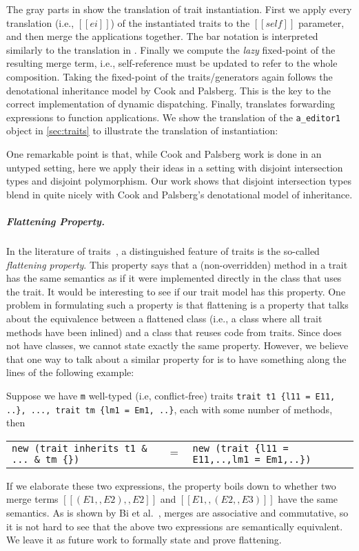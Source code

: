 The gray parts in  show the translation of trait instantiation.
First we apply every translation (i.e., $[[ei]]$) of the instantiated traits to the $[[self]]$ parameter,
and then merge the applications together. The bar notation is
interpreted similarly to the translation in . Finally we compute the \emph{lazy}
fixed-point of the resulting merge term, i.e., self-reference must be updated to refer to
the whole composition. Taking the fixed-point of the
traits/generators again follows the denotational inheritance model by 
Cook and Palsberg.
 This is the key to the correct implementation of dynamic
 dispatching. Finally,
 translates forwarding expressions to function
applications. We show the translation of the
\lstinline{a_editor1} object in \cref{sec:traits} to illustrate the
translation of instantiation:

One remarkable point is that, while Cook and Palsberg work is done in
an untyped setting, here we apply their ideas in a setting with
disjoint intersection types and disjoint polymorphism. Our work shows that
disjoint intersection types blend in quite nicely with Cook and
Palsberg's denotational model of inheritance.

\subparagraph{Flattening Property.}

In the literature of traits~\cite{Ducasse_2006, scharli2003traits, JOT:issue_2006_05/article4},
a distinguished feature of traits is the
so-called \textit{flattening property}. This property says that a (non-overridden) method in a
trait has the same semantics as if it were implemented directly in the class
that uses the trait. It would be interesting to see if our trait model has this
property. One problem in formulating such a property is that flattening is a
property that talks about the equivalence between a flattened class (i.e., a
class where all trait methods have been inlined) and a class that reuses code
from traits. Since \name does not have classes, we cannot state exactly the same
property. However, we believe that one way to talk about a similar property for \name is to have something
along the lines of the following example:
\begin{example}[Flattening]
  Suppose we have \lstinline$m$ well-typed (i.e, conflict-free) traits \lstinline$trait t1 {l11 = E11, ..}, ..., trait tm {lm1 = Em1, ..}$,
  each with some number of methods, then
  \begin{tabular}{lll}
   \lstinline|new (trait inherits t1 & ... & tm {})| & $=$ & \lstinline|new (trait {l11 = E11,..,lm1 = Em1,..})|
  \end{tabular}
\end{example}
If we elaborate these two expressions, the property boils down to whether two merge terms
$[[(E1 ,, E2) ,, E2]]$ and $[[E1 ,, (E2 ,, E3)]]$
have the same semantics. As is shown by Bi et al.~\cite{xuan_nested}, merges are
associative and commutative, so it is not hard to see that the above two expressions
are semantically equivalent. We leave it as future work to formally state and prove flattening.

